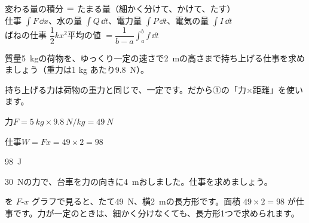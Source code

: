 \begin{taisetsu}
変わる量の積分 ＝ たまる量（細かく分けて、かけて、たす）\\
\quad 仕事 $\displaystyle\int F\,\dd x$、水の量 $\displaystyle\int Q\,\dd t$、電力量 $\displaystyle\int P\,\dd t$、電気の量 $\displaystyle\int I\,\dd t$\\
ばねの仕事 $\dfrac{1}{2}kx^2$\qquad 平均の値 $=\dfrac{1}{b-a}\displaystyle\int_a^b f\,\dd t$
\end{taisetsu}

\begin{kotoba}
\small
{}
\end{kotoba}


\begin{reidai}[一定の力の仕事]
質量\qty{5}{kg}の荷物を、ゆっくり一定の速さで\qty{2}{m}の高さまで持ち上げる仕事を求めましょう（重力は1 kg あたり\qty{9.8}{N}）。\par
\kangaekata 持ち上げる力は荷物の重力と同じで、一定です。だから①の「力×距離」を使います。\par
\shiki 力\quad $F=\qty{5}{kg}\times\qty{9.8}{N/kg}=\qty{49}{N}$\par
\hspace*{2.6\zw}仕事\quad $W=Fx=49\times2=98$\par
\kotae \qty{98}{J}
\end{reidai}

\begin{jibun}
\qty{30}{N}の力で、台車を力の向きに\qty{4}{m}おしました。仕事を求めましょう。
\end{jibun}

\noindent\begin{minipage}[c]{0.46\linewidth}
\end{minipage}\hfill
\begin{minipage}[c]{0.52\linewidth}\raggedright
{}を $F$-$x$ グラフで見ると、たて\qty{49}{N}、横\qty{2}{m}の長方形です。面積 $49\times2=98$ が仕事です。力が一定のときは、細かく分けなくても、長方形1つで求められます。
\end{minipage}

